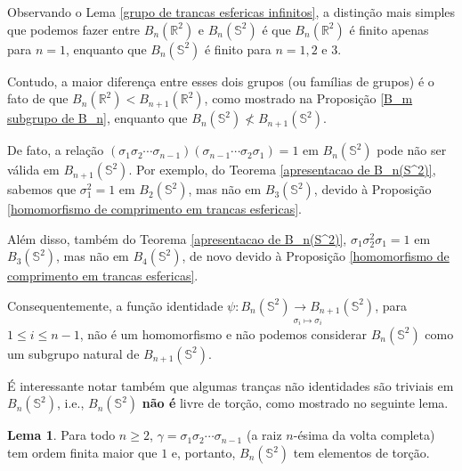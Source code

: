 \documentclass[a4paper,portuguese,11pt,twoside, leqno]{book}
\theoremstyle{definition}
\newtheorem{lemma}[theorem]{Lema}
\begin{document}
	\par\vspace{0.3cm} Observando o Lema \eqref{grupo de trancas esfericas infinitos}, a distinção mais simples que podemos fazer entre $B_n(\mathbb{R}^2)$ e $B_n(\mathbb{S}^2)$ é que $B_n(\mathbb{R}^2)$ é finito apenas para $n=1$, enquanto que $B_n(\mathbb{S}^2)$ é finito para $n=1,2$ e $3$.
	\par\vspace{0.3cm} Contudo, a maior diferença entre esses dois grupos (ou famílias de grupos) é o fato de que $B_n(\mathbb{R}^2)<B_{n+1}(\mathbb{R}^2)$, como mostrado na Proposição \eqref{B_m subgrupo de B_n}, enquanto que $B_n(\mathbb{S}^2)\nless B_{n+1}(\mathbb{S}^2)$.
	\par\vspace{0.3cm} De fato, a relação $(\sigma_1\sigma_2\cdots\sigma_{n-1})(\sigma_{n-1}\cdots\sigma_2\sigma_1) = 1$ em $B_n(\mathbb{S}^2)$ pode não ser válida em $B_{n+1}(\mathbb{S}^2)$. Por exemplo, do Teorema \eqref{apresentacao de B_n(S^2)}, sabemos que $\sigma_1^2 = 1$ em $B_2(\mathbb{S}^2)$, mas não em $B_3(\mathbb{S}^2)$, devido à Proposição \eqref{homomorfismo de comprimento em trancas esfericas}.
	\par\vspace{0.3cm} Além disso, também do Teorema \eqref{apresentacao de B_n(S^2)}, $\sigma_1\sigma_2^2\sigma_1 = 1$ em $B_3(\mathbb{S}^2)$, mas não em $B_4(\mathbb{S}^2)$, de novo devido à Proposição \eqref{homomorfismo de comprimento em trancas esfericas}.
	\par\vspace{0.3cm} Consequentemente, a função identidade $\displaystyle{\psi: \underset{\sigma_i\mapsto\sigma_i}{B_n(\mathbb{S}^2)\to B_{n+1}(\mathbb{S}^2)}}$, para $1\leq i\leq n-1$, não é um homomorfismo e não podemos considerar $B_n(\mathbb{S}^2)$ como um subgrupo natural de $B_{n+1}(\mathbb{S}^2)$.
	\par\vspace{0.3cm} É interessante notar também que algumas tranças não identidades são triviais em $B_n(\mathbb{S}^2)$, i.e., $B_n(\mathbb{S}^2)$ \textbf{não é} livre de torção, como mostrado no seguinte lema.
	
	\begin{lemma}
		\label{B_(S^2) nao livre de torcao}
		Para todo $n\geq2$, $\gamma = \sigma_1\sigma_2\cdots\sigma_{n-1}$ (a raiz $n$-ésima da volta completa) tem ordem finita maior que $1$ e, portanto, $B_n(\mathbb{S}^2)$ tem elementos de torção.
	\end{lemma}
	
\end{document}

